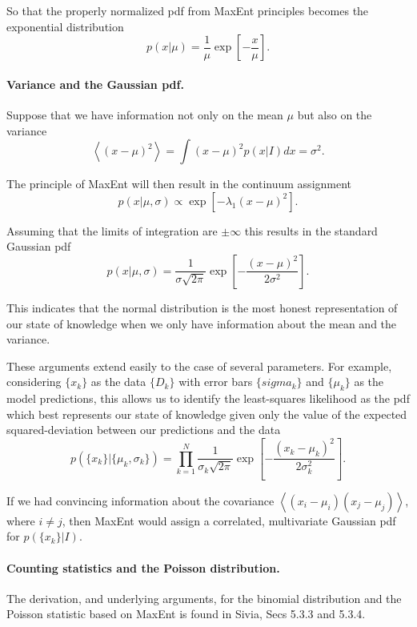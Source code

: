 \documentclass[%
oneside,                 %
final,                   %
10pt]{article}
\newenvironment{notice_mdfboxadmon}[1][]{
\begin{notice_mdfboxmdframed}[frametitle=#1]
}
{
\end{notice_mdfboxmdframed}
}
\begin{document}
So that the properly normalized pdf from MaxEnt principles becomes the exponential distribution
\[
p(x|\mu) = \frac{1}{\mu} \exp \left[ -\frac{x}{\mu} \right].
\]

\paragraph{Variance and the Gaussian pdf.}
Suppose that we have information not only on the mean $\mu$ but also on the variance
\[
\left\langle (x-\mu)^2 \right\rangle = \int (x-\mu)^2 p(x|I) dx = \sigma^2.
\]

The principle of MaxEnt will then result in the continuum assignment
\[
p(x|\mu,\sigma) \propto \exp \left[ - \lambda_1 ( x - \mu )^2 \right].
\]

Assuming that the limits of integration are $\pm \infty$ this results in the standard Gaussian pdf
\[
p(x|\mu,\sigma) = \frac{1}{\sigma \sqrt{2\pi}} \exp \left[ - \frac{( x - \mu )^2}{2\sigma^2} \right].
\]

This indicates that the normal distribution is the most honest representation of our state of knowledge when we only have information about the mean and the variance.


\begin{notice_mdfboxadmon}[Notice]
These arguments extend easily to the case of several parameters. For example, considering $\{x_k\}$ as the data $\{ D_k\}$ with error bars $\{sigma_k\}$ and $\{\mu_k\}$ as the model predictions, this allows us to identify the least-squares likelihood as the pdf which best represents our state of knowledge given only the value of the expected squared-deviation between our predictions and the data
\[
p\left( \{x_k\} | \{\mu_k, \sigma_k\} \right) = \prod_{k=1}^N \frac{1}{\sigma_k \sqrt{2\pi}} \exp \left[ - \frac{( x_k - \mu_k )^2}{2\sigma_k^2} \right].
\]

If we had convincing information about the covariance $\left\langle \left( x_i - \mu_i \right) \left( x_j - \mu_j \right) \right\rangle$, where $i \neq j$, then MaxEnt would assign a correlated, multivariate Gaussian pdf for $p\left( \{ x_k \} | I \right)$.
\end{notice_mdfboxadmon} %



\paragraph{Counting statistics and the Poisson distribution.}
The derivation, and underlying arguments, for the binomial distribution and the Poisson statistic based on MaxEnt is found in Sivia, Secs 5.3.3 and 5.3.4.


\end{document}
